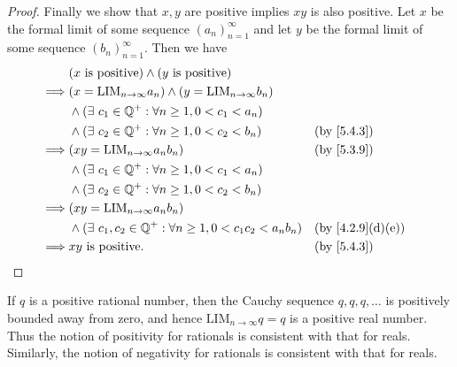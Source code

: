 \begin{proof}
  Finally we show that \(x, y\) are positive implies \(xy\) is also positive.
  Let \(x\) be the formal limit of some sequence \((a_n)_{n = 1}^{\infty}\) and let \(y\) be the formal limit of some sequence \((b_n)_{n = 1}^{\infty}\).
  Then we have
  \begin{align*}
             & (x \text{ is positive}) \land (y \text{ is positive})                                                             \\
    \implies & (x = \text{LIM}_{n \to \infty} a_n) \land (y = \text{LIM}_{n \to \infty} b_n)                                     \\
             & \land (\exists\ c_1 \in \Q^+ : \forall n \geq 1, 0 < c_1 < a_n)                                                   \\
             & \land (\exists\ c_2 \in \Q^+ : \forall n \geq 1, 0 < c_2 < b_n)               &  & \by{5.4.3}                     \\
    \implies & (xy = \text{LIM}_{n \to \infty} a_n b_n)                                      &  & \by{5.3.9}                     \\
             & \land (\exists\ c_1 \in \Q^+ : \forall n \geq 1, 0 < c_1 < a_n)                                                   \\
             & \land (\exists\ c_2 \in \Q^+ : \forall n \geq 1, 0 < c_2 < b_n)                                                   \\
    \implies & (xy = \text{LIM}_{n \to \infty} a_n b_n)                                                                          \\
             & \land (\exists\ c_1, c_2 \in \Q^+ : \forall n \geq 1, 0 < c_1 c_2 < a_n b_n)  &  & \text{(by \cref{4.2.9}(d)(e))} \\
    \implies & xy \text{ is positive}.                                                       &  & \by{5.4.3}
  \end{align*}
\end{proof}

\begin{note}
  If \(q\) is a positive rational number, then the Cauchy sequence \(q, q, q, \dots\) is positively bounded away from zero, and hence \(\text{LIM}_{n \to \infty} q = q\) is a positive real number.
  Thus the notion of positivity for rationals is consistent with that for reals.
  Similarly, the notion of negativity for rationals is consistent with that for reals.
\end{note}

